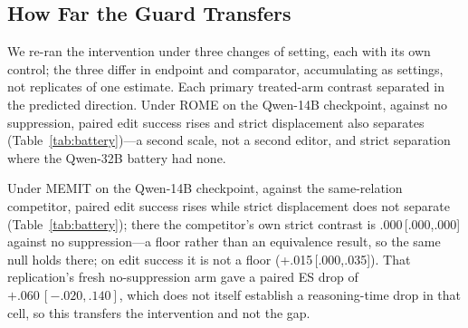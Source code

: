 \documentclass[letterpaper]{article} %
\begin{document}
\subsection{How Far the Guard Transfers}
\label{sec:control-transfer}

We re-ran the intervention under three changes of setting, each with its own control; the three differ in endpoint and comparator, accumulating as settings, not replicates of one estimate.  Each primary treated-arm contrast separated in the predicted direction.
Under ROME on the Qwen-14B checkpoint, against no suppression, paired edit success rises and strict displacement also separates (Table~\ref{tab:battery})---a second scale, not a second editor, and strict separation where the Qwen-32B battery had none.

Under MEMIT on the Qwen-14B checkpoint, against the same-relation competitor, paired edit success rises while strict displacement does not separate (Table~\ref{tab:battery}); there the competitor's own strict contrast is .000\,[.000,.000] against no suppression---a floor rather than an equivalence result, so the same null holds there; on edit success it is not a floor (+.015\,[.000,.035]).  That replication's fresh no-suppression arm gave a paired ES drop of \(+.060\,[-.020,.140]\), which does not itself establish a reasoning-time drop in that cell, so this transfers the intervention and not the gap. %
\end{document}
